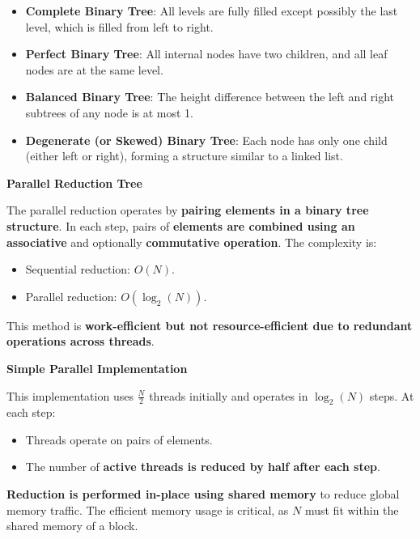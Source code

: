 \begin{remarkbox}
\begin{itemize}
\begin{itemize}
            \item \textbf{Complete Binary Tree}: All levels are fully filled except possibly the last level, which is filled from left to right.
            
            \item \textbf{Perfect Binary Tree}: All internal nodes have two children, and all leaf nodes are at the same level.
            
            \item \textbf{Balanced Binary Tree}: The height difference between the left and right subtrees of any node is at most 1.
            
            \item \textbf{Degenerate (or Skewed) Binary Tree}: Each node has only one child (either left or right), forming a structure similar to a linked list.
        \end{itemize}
    \end{itemize}
\end{remarkbox}

\highspace
\begin{flushleft}
    \textcolor{Green3}{ \textbf{Parallel Reduction Tree}}
\end{flushleft}
The parallel reduction operates by \textbf{pairing elements in a binary tree structure}. In each step, pairs of \textbf{elements are combined using an associative} and optionally \textbf{commutative operation}. The complexity is:
\begin{itemize}
    \item Sequential reduction: $O\left(N\right)$.
    \item Parallel reduction: $O\left(\log_{2}\left(N\right)\right)$.
\end{itemize}
This method is \textbf{work-efficient but not resource-efficient due to redundant operations across threads}.

\highspace
\begin{flushleft}
    \textcolor{Green3}{ \textbf{Simple Parallel Implementation}}
\end{flushleft}
This implementation uses $\frac{N}{2}$ threads initially and operates in $\log_{2}\left(N\right)$ steps. At each step:
\begin{itemize}
    \item Threads operate on pairs of elements.
    \item The number of \textbf{active threads is reduced by half after each step}.
\end{itemize}
\textbf{Reduction is performed in-place using shared memory} to reduce global memory traffic. The efficient memory usage is critical, as $N$ must fit within the shared memory of a block.

